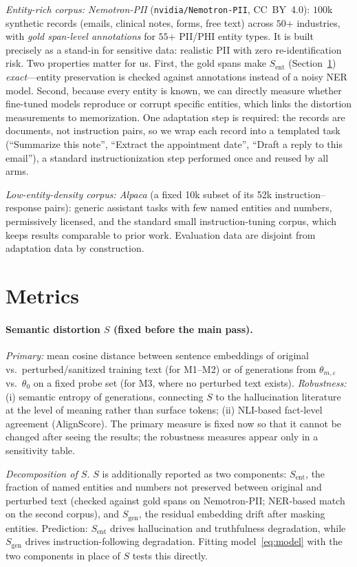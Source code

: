 \documentclass{article}
\theoremstyle{definition}
\theoremstyle{plain}
\theoremstyle{remark}
\newcommand{\eps}{\varepsilon}
\newcommand{\Sdist}{S}
\newcommand{\seclabel}[1]{\label{sec:#1}}
\newcommand{\secref}[1]{Section~\ref{sec:#1}}
\begin{document}
\emph{Entity-rich corpus: Nemotron-PII}
(\texttt{nvidia/Nemotron-PII}, CC~BY~4.0): $100$k synthetic records
(emails, clinical notes, forms, free text) across $50$+ industries, with
\emph{gold span-level annotations} for $55$+ PII/PHI entity types. It is
built precisely as a stand-in for sensitive data: realistic PII with zero
re-identification risk. Two properties matter for us. First, the gold spans
make $\Sdist_{\mathrm{ent}}$ (\secref{metrics}) \emph{exact}---entity
preservation is checked against annotations instead of a noisy NER model.
Second, because every entity is known, we can directly measure whether
fine-tuned models reproduce or corrupt specific entities, which links the
distortion measurements to memorization. One adaptation step is required:
the records are documents, not instruction pairs, so we wrap each record
into a templated task (``Summarize this note'', ``Extract the appointment
date'', ``Draft a reply to this email''), a standard instructionization
step performed once and reused by all arms.

\emph{Low-entity-density corpus: Alpaca} (a fixed 10k subset of its 52k
instruction--response pairs): generic assistant tasks with few named
entities and numbers, permissively licensed, and the standard small
instruction-tuning corpus, which keeps results comparable to prior work.
Evaluation data are disjoint from adaptation data by construction.

\section{Metrics}\seclabel{metrics}
\paragraph{Semantic distortion $\Sdist$ (fixed before the main pass).}
\emph{Primary:} mean cosine distance between sentence
embeddings of original vs.\ perturbed/sanitized
training text (for M1--M2) or of generations from $\theta_{m,\eps}$ vs.\
$\theta_0$ on a fixed probe set (for M3, where no perturbed text exists).
\emph{Robustness:} (i) semantic entropy of
generations, connecting $\Sdist$ to the hallucination literature at the level
of meaning rather than surface tokens; (ii) NLI-based fact-level agreement
(AlignScore). The primary measure is fixed now so that it cannot be changed
after seeing the results; the robustness measures appear only in a
sensitivity table.

\emph{Decomposition of $\Sdist$.} $\Sdist$ is additionally reported as two
components: $\Sdist_{\mathrm{ent}}$, the fraction of named entities and
numbers not preserved between original and perturbed text (checked against
gold spans on Nemotron-PII; NER-based match on the second corpus), and
$\Sdist_{\mathrm{gen}}$, the residual embedding drift after masking
entities. Prediction: $\Sdist_{\mathrm{ent}}$ drives hallucination and
truthfulness degradation, while $\Sdist_{\mathrm{gen}}$ drives
instruction-following degradation. Fitting model~\eqref{eq:model} with the
two components in place of $\Sdist$ tests this directly.
\end{document}
